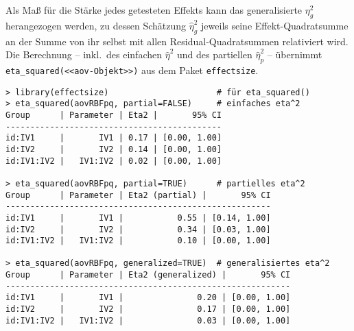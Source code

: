 Als Maß für die Stärke jedes getesteten Effekts kann das generalisierte $\eta_{g}^{2}$ herangezogen werden, zu dessen Schätzung $\hat{\eta}_{g}^{2}$ jeweils seine Effekt-Quadratsumme an der Summe von ihr selbst mit allen Residual-Quadratsummen relativiert wird. Die Berechnung -- inkl.\ des einfachen $\hat{\eta}^{2}$ und des partiellen $\hat{\eta}_{p}^{2}$ -- übernimmt \lstinline!eta_squared(<<aov-Objekt>>)! aus dem Paket \lstinline!effectsize!.
\begin{lstlisting}
> library(effectsize)                      # für eta_squared()
> eta_squared(aovRBFpq, partial=FALSE)     # einfaches eta^2
Group      | Parameter | Eta2 |       95% CI
--------------------------------------------
id:IV1     |       IV1 | 0.17 | [0.00, 1.00]
id:IV2     |       IV2 | 0.14 | [0.00, 1.00]
id:IV1:IV2 |   IV1:IV2 | 0.02 | [0.00, 1.00]

> eta_squared(aovRBFpq, partial=TRUE)      # partielles eta^2
Group      | Parameter | Eta2 (partial) |       95% CI
------------------------------------------------------
id:IV1     |       IV1 |           0.55 | [0.14, 1.00]
id:IV2     |       IV2 |           0.34 | [0.03, 1.00]
id:IV1:IV2 |   IV1:IV2 |           0.10 | [0.00, 1.00]

> eta_squared(aovRBFpq, generalized=TRUE)  # generalisiertes eta^2
Group      | Parameter | Eta2 (generalized) |       95% CI
----------------------------------------------------------
id:IV1     |       IV1 |               0.20 | [0.00, 1.00]
id:IV2     |       IV2 |               0.17 | [0.00, 1.00]
id:IV1:IV2 |   IV1:IV2 |               0.03 | [0.00, 1.00]
\end{lstlisting}

